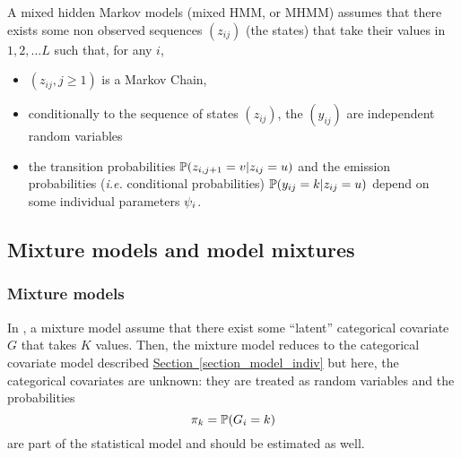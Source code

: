 A mixed hidden Markov models (mixed HMM, or MHMM) assumes that there exists some non observed sequences $(z_{ij})$ (the states) that take their values in ${1,2,\ldots L}$ such that, for any $i$,
\begin{itemize}
\item $(z_{ij}, j\geq 1)$ is a Markov Chain,
\item conditionally to the sequence of states $(z_{ij})$, the $(y_{ij})$ are independent random variables
\item the transition probabilities $\mathbb{P}\!\left(z_{i,j+1}=v | z_{ij}=u\right)$ and the emission probabilities ({\it i.e.} conditional probabilities) $\mathbb{P}\!\left(y_{ij}=k | z_{ij}=u\right)$ depend on some individual parameters ${\psi_i}$.
\end{itemize}


\subsection{Mixture models and model mixtures} \label{section_model_mixture}
\subsubsection{Mixture models}
In \monolix, a mixture model assume that there exist some ``latent'' categorical covariate  $G$ that takes $K$ values.
Then, the mixture model reduces to the categorical covariate model described \hyperref[section_model_catcov]{Section~\ref*{section_model_indiv}} but
here, the categorical covariates are unknown: they are treated as random variables and the probabilities
$$\pi_k = \mathbb{P}\!\left(G_i=k\right)$$
are part of the statistical model and should be estimated as well.


